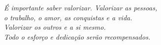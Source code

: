\begin{epigrafe}
    \vspace*{\fill}
	\begin{flushright}
		
		\textit{É importante saber valorizar. Valorizar as pessoas,\\
		 o trabalho, o amor, as conquistas e a vida.\\
		Valorizar os outros e a si mesmo.\\
		Todo o esforço e dedicação serão recompensados.}
	\end{flushright}
\end{epigrafe}
